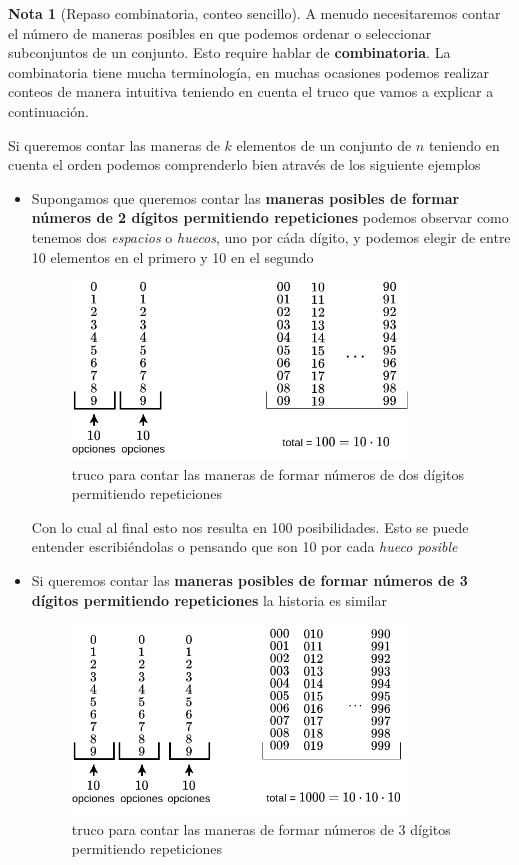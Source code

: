 \documentclass[]{book}
\theoremstyle{plain}
\theoremstyle{definition}
\newtheorem{note}[theorem]{Nota}
\theoremstyle{definition} %
\begin{document}
\begin{note}[Repaso combinatoria, conteo sencillo]

A menudo necesitaremos contar el número de maneras posibles en que podemos
ordenar o seleccionar subconjuntos de un conjunto. Esto require hablar de \textbf{combinatoria}.
La combinatoria tiene mucha terminología, en muchas ocasiones podemos 
realizar conteos de manera intuitiva teniendo en cuenta el truco que vamos a explicar a continuación. 

Si queremos contar las maneras de $k$ elementos de un conjunto de $n$ teniendo en cuenta el orden podemos 
comprenderlo bien através de los siguiente ejemplos

\begin{itemize}
  \item Supongamos que queremos contar las \textbf{maneras posibles de formar números de 2 dígitos permitiendo repeticiones} podemos observar como 
tenemos dos \emph{espacios} o \emph{huecos}, uno por cáda dígito, y podemos elegir 
de entre 10 elementos en el primero y 10 en el segundo

\begin{figure}[htbp]
  \centering
  \includegraphics[width=3.5in,height=\textheight]{img/conteo_basico_1.png}
  \caption{truco para contar las maneras de formar números de dos dígitos permitiendo repeticiones}
  \end{figure}%
  
Con lo cual al final esto nos resulta en 100 posibilidades. Esto se puede entender escribiéndolas o pensando que son 10 por cada \emph{hueco posible}

\item Si queremos contar las \textbf{maneras posibles de formar números de 3 dígitos permitiendo repeticiones} la historia es similar

\begin{figure}[htbp]
  \centering
  \includegraphics[width=3.5in,height=\textheight]{img/conteo_basico_2.png}
  \caption{truco para contar las maneras de formar números de 3 dígitos permitiendo repeticiones}
  \end{figure}%
  

\end{itemize}
\end{note}
\end{document}
